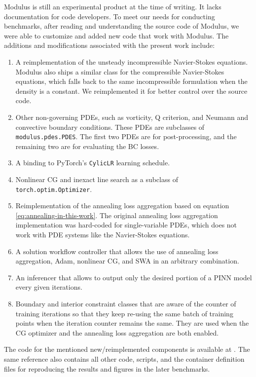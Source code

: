 Modulus is still an experimental product at the time of writing.
It lacks documentation for code developers. 
To meet our needs for conducting benchmarks, after reading and understanding the source code of Modulus, we were able to customize and added new code that work with Modulus.
The additions and modifications associated with the present work include:
\begin{enumerate}[nolistsep]
    \item A reimplementation of the unsteady incompressible Navier-Stokes equations.
        Modulus also ships a similar class for the compressible Navier-Stokes equations, which falls back to the same incompressible formulation when the density is a constant.
        We reimplemented it for better control over the source code.
    \item Other non-governing PDEs, such as vorticity, Q criterion, and Neumann and convective boundary conditions.
        These PDEs are subclasses of \lstinline{modulus.pdes.PDES}.
        The first two PDEs are for post-processing, and the remaining two are for evaluating the BC losses.
    \item A binding to PyTorch's \lstinline{CylicLR} learning schedule.
    \item Nonlinear CG and inexact line search as a subclass of \lstinline{torch.optim.Optimizer}.
    \item Reimplementation of the annealing loss aggregation based on equation \eqref{eq:annealing-in-this-work}.
        The original annealing loss aggregation implementation was hard-coded for single-variable PDEs, which does not work with PDE systems like the Navier-Stokes equations.
    \item A solution workflow controller that allows the use of annealing loss aggregation, Adam, nonlinear CG, and SWA in an arbitrary combination. 
    \item An inferencer that allows to output only the desired portion of a PINN model every given iterations. 
    \item Boundary and interior constraint classes that are aware of the counter of training iterations so that they keep re-using the same batch of training points when the iteration counter remains the same.
    They are used when the CG optimizer and the annealing loss aggregation are both enabled.
\end{enumerate}

The code for the mentioned new/reimplemented components is available at \cite{chuang_dissertation_nodate}.
The same reference also contains all other code, scripts, and the container definition files for reproducing the results and figures in the later benchmarks.
